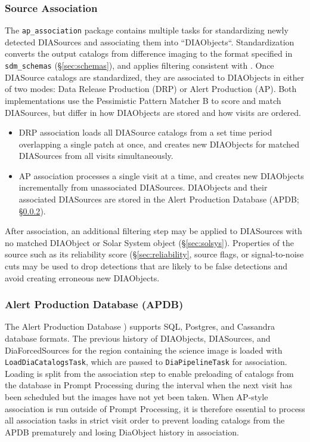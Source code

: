 \subsubsection{Source Association}
\label{sec:association}

The \texttt{ap\_association} package contains multiple tasks for standardizing newly detected DIASources and associating them into ``DIAObjects``.
Standardization converts the output catalogs from difference imaging to the format specified in \texttt{sdm\_schemas} (\S\ref{sec:schemas}), and applies filtering consistent with \citep{DMTN-199}.
Once DIASource catalogs are standardized, they are associated to DIAObjects in either of two modes: Data Release Production (DRP) or Alert Production (AP).
Both implementations use the Pessimistic Pattern Matcher B \citep{DMTN-031} to score and match DIASources, but differ in how DIAObjects are stored and how visits are ordered.

\begin{itemize}
\item DRP association loads all DIASource catalogs from a set time period overlapping a single patch at once, and creates new DIAObjects for matched DIASources from all visits simultaneously.
\item AP association processes a single visit at a time, and creates new DIAObjects incrementally from unassociated DIASources.
DIAObjects and their associated DIASources are stored in the Alert Production Database (APDB; \S\ref{sec:apdb}).
\end{itemize}

After association, an additional filtering step may be applied to DIASources with no matched DIAObject or Solar System object (\S\ref{sec:solsys}).
Properties of the source such as its reliability score (\S\ref{sec:reliability}, source flags, or signal-to-noise cuts may be used to drop detections that are likely to be false detections and avoid creating erroneous new DIAObjects.

\subsubsection{Alert Production Database (APDB)}
\label{sec:apdb}

The Alert Production Database \citep[APDB;][]{DMTN-293}) supports SQL, Postgres, and Cassandra database formats.
The previous history of DIAObjects, DIASources, and DiaForcedSources for the region containing the science image is loaded with \texttt{LoadDiaCatalogsTask}, which are passed to \texttt{DiaPipelineTask} for association.
Loading is split from the association step to enable preloading of catalogs from the database in Prompt Processing during the interval when the next visit has been scheduled but the images have not yet been taken.
When AP-style association is run outside of Prompt Processing, it is therefore essential to process all association tasks in strict visit order to prevent loading catalogs from the APDB prematurely and losing DiaObject history in association.

